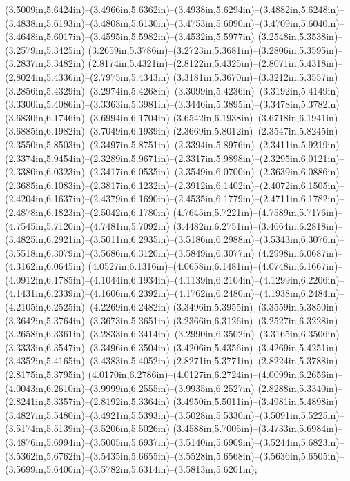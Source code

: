 (3.5009in,5.6424in)--(3.4966in,5.6362in)--(3.4938in,5.6294in)--(3.4882in,5.6248in)--(3.4838in,5.6193in)--(3.4808in,5.6130in)--(3.4753in,5.6090in)--(3.4709in,5.6040in)--(3.4648in,5.6017in)--(3.4595in,5.5982in)--(3.4532in,5.5977in) (3.2548in,5.3538in)--(3.2579in,5.3425in) (3.2659in,5.3786in)--(3.2723in,5.3681in)--(3.2806in,5.3595in)--(3.2837in,5.3482in) (2.8174in,5.4321in)--(2.8122in,5.4325in)--(2.8071in,5.4318in)--(2.8024in,5.4336in)--(2.7975in,5.4343in) (3.3181in,5.3670in)--(3.3212in,5.3557in) (3.2856in,5.4329in)--(3.2974in,5.4268in)--(3.3099in,5.4236in)--(3.3192in,5.4149in)--(3.3300in,5.4086in)--(3.3363in,5.3981in)--(3.3446in,5.3895in)--(3.3478in,5.3782in) (3.6830in,6.1746in)--(3.6994in,6.1704in) (3.6542in,6.1938in)--(3.6718in,6.1941in)--(3.6885in,6.1982in)--(3.7049in,6.1939in) (2.3669in,5.8012in)--(2.3547in,5.8245in)--(2.3550in,5.8503in)--(2.3497in,5.8751in)--(2.3394in,5.8976in)--(2.3411in,5.9219in)--(2.3374in,5.9454in)--(2.3289in,5.9671in)--(2.3317in,5.9898in)--(2.3295in,6.0121in)--(2.3380in,6.0323in)--(2.3417in,6.0535in)--(2.3549in,6.0700in)--(2.3639in,6.0886in)--(2.3685in,6.1083in)--(2.3817in,6.1232in)--(2.3912in,6.1402in)--(2.4072in,6.1505in)--(2.4204in,6.1637in)--(2.4379in,6.1690in)--(2.4535in,6.1779in)--(2.4711in,6.1782in)--(2.4878in,6.1823in)--(2.5042in,6.1780in) (4.7645in,5.7221in)--(4.7589in,5.7176in)--(4.7545in,5.7120in)--(4.7481in,5.7092in) (3.4482in,6.2751in)--(3.4664in,6.2818in)--(3.4825in,6.2921in)--(3.5011in,6.2935in)--(3.5186in,6.2988in)--(3.5343in,6.3076in)--(3.5518in,6.3079in)--(3.5686in,6.3120in)--(3.5849in,6.3077in) (4.2998in,6.0687in)--(4.3162in,6.0645in) (4.0527in,6.1316in)--(4.0658in,6.1481in)--(4.0748in,6.1667in)--(4.0912in,6.1785in)--(4.1044in,6.1934in)--(4.1139in,6.2104in)--(4.1299in,6.2206in)--(4.1431in,6.2339in)--(4.1606in,6.2392in)--(4.1762in,6.2480in)--(4.1938in,6.2484in)--(4.2105in,6.2525in)--(4.2269in,6.2482in) (3.3496in,5.3955in)--(3.3559in,5.3850in)--(3.3642in,5.3764in)--(3.3673in,5.3651in) (3.2366in,6.3126in)--(3.2527in,6.3228in)--(3.2658in,6.3361in)--(3.2833in,6.3414in)--(3.2990in,6.3502in)--(3.3165in,6.3506in)--(3.3333in,6.3547in)--(3.3496in,6.3504in) (3.4206in,5.4356in)--(3.4269in,5.4251in)--(3.4352in,5.4165in)--(3.4383in,5.4052in) (2.8271in,5.3771in)--(2.8224in,5.3788in)--(2.8175in,5.3795in) (4.0170in,6.2786in)--(4.0127in,6.2724in)--(4.0099in,6.2656in)--(4.0043in,6.2610in)--(3.9999in,6.2555in)--(3.9935in,6.2527in) (2.8288in,5.3340in)--(2.8241in,5.3357in)--(2.8192in,5.3364in) (3.4950in,5.5011in)--(3.4981in,5.4898in) (3.4827in,5.5480in)--(3.4921in,5.5393in)--(3.5028in,5.5330in)--(3.5091in,5.5225in)--(3.5174in,5.5139in)--(3.5206in,5.5026in) (3.4588in,5.7005in)--(3.4733in,5.6984in)--(3.4876in,5.6994in)--(3.5005in,5.6937in)--(3.5140in,5.6909in)--(3.5244in,5.6823in)--(3.5362in,5.6762in)--(3.5435in,5.6655in)--(3.5528in,5.6568in)--(3.5636in,5.6505in)--(3.5699in,5.6400in)--(3.5782in,5.6314in)--(3.5813in,5.6201in);
